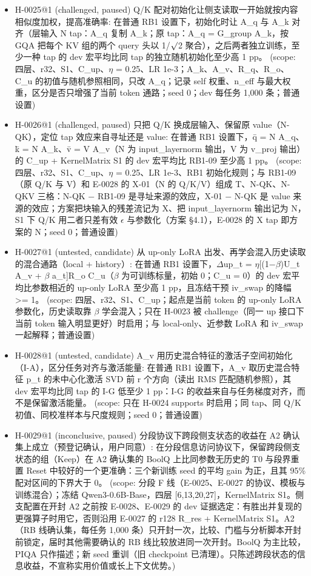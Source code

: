 \documentclass[11pt]{article}
\begin{document}
\begin{itemize}
\item H-0025@1 (challenged, paused) Q/K 配对初始化让侧支读取一开始就按内容相似度加权，提高准确率: 在普通 RB1 设置下，初始化时让 A\_q 与 A\_k 对齐（层输入 N tap：A\_q 复制 A\_k；原 tap：A\_q = G\_group A\_k，按 GQA 把每个 KV 组的两个 query 头以 1/\ensuremath{\surd}2 聚合），之后两者独立训练，至少一种 tap 的 dev 宏平均比同 tap 的独立随机初始化至少高 1 pp。 (scope: 四层、r32、S1、C\_up、\ensuremath{\eta} = 0.25、LR 1e-3；A\_k、A\_v、R\_q、R\_o、C\_u 的初值与随机参照相同，只改 A\_q；记录 self 权重、n\_eff 与最大权重，区分是否只增强了当前 token 通路；seed 0；dev 每任务 1,000 条；普通设置)
\item H-0026@1 (challenged, paused) 只把 Q/K 换成层输入、保留原 value（N-QK），定位 tap 效应来自寻址还是 value: 在普通 RB1 设置下，q̄ = N A\_q、k̄ = N A\_k、v̄ = V A\_v（N 为 input\_layernorm 输出，V 为 v\_proj 输出）的 C\_up + KernelMatrix S1 的 dev 宏平均比 RB1-09 至少高 1 pp。 (scope: 四层、r32、S1、C\_up、\ensuremath{\eta} = 0.25、LR 1e-3、RB1 初始化规则；与 RB1-09（原 Q/K 与 V）和 E-0028 的 X-01（N 的 Q/K/V）组成 T、N-QK、N-QKV 三格：N-QK \ensuremath{-} RB1-09 是寻址来源的效应，X-01 \ensuremath{-} N-QK 是 value 来源的效应；方案把块输入的残差流记为 X、把 input\_layernorm 输出记为 N，S1 下 Q/K 用二者只差有效 \ensuremath{\epsilon} 与参数化（方案 §4.1），E-0028 的 X tap 即方案的 N；seed 0；普通设置)
\item H-0027@1 (untested, candidate) 从 up-only LoRA 出发、再学会混入历史读取的混合通路（local + history）: 在普通 RB1 设置下，\ensuremath{\Delta}up\_t = \ensuremath{\eta}[(1\ensuremath{-}\ensuremath{\beta})U\_t A\_v + \ensuremath{\beta} a\_t]R\_o C\_u（\ensuremath{\beta} 为可训练标量，初始 0；C\_u = 0）的 dev 宏平均比参数相近的 up-only LoRA 至少高 1 pp，且冻结干预 iv\_swap 的降幅 \textgreater{}= 1。 (scope: 四层、r32、S1、C\_up；起点是当前 token 的 up-only LoRA 参数化，历史读取靠 \ensuremath{\beta} 学会混入；只在 H-0023 被 challenge（同一 up 接口下当前 token 输入明显更好）时启用；与 local-only、近参数 LoRA 和 iv\_swap 一起解释；普通设置)
\item H-0028@1 (untested, candidate) A\_v 用历史混合特征的激活子空间初始化（I-A），区分任务对齐与激活能量: 在普通 RB1 设置下，A\_v 取历史混合特征 p\_t 的未中心化激活 SVD 前 r 个方向（读出 RMS 匹配随机参照），其 dev 宏平均比同 tap 的 I-G 低至少 1 pp：I-G 的收益来自与任务梯度对齐，而不是保留激活能量。 (scope: 只在 H-0024 supports 时启用；同 tap、同 Q/K 初值、同校准样本与尺度规则；seed 0；普通设置)
\item H-0029@1 (inconclusive, paused) 分段协议下跨段侧支状态的收益在 A2 确认集上成立（预登记确认，用户同意）: 在分段信息访问协议下，保留跨段侧支状态的组（Keep）在 A2 确认集的 BoolQ 上比同参数无历史的 T0 与段界重置 Reset 中较好的一个更准确：三个新训练 seed 的平均 gain 为正，且其 95\% 配对区间的下界大于 0。 (scope: 分段 F 线（E-0025、E-0027 的协议、模板与训练混合）；冻结 Qwen3-0.6B-Base，四层 [6,13,20,27]，KernelMatrix S1。侧支配置在开封 A2 之前按 E-0028、E-0029 的 dev 证据选定：有胜出并复现的更强算子时用它，否则沿用 E-0027 的 r128 R\_res + KernelMatrix S1。A2（RB 线确认集，每任务 1,000 条）只开封一次，比较、门槛与分析脚本开封前锁定，届时其他需要确认的 RB 线比较放进同一次开封。BoolQ 为主比较，PIQA 只作描述；新 seed 重训（旧 checkpoint 已清理）。只陈述跨段状态的信息收益，不宣称实用价值或长上下文优势。)

\end{itemize}
\end{document}
